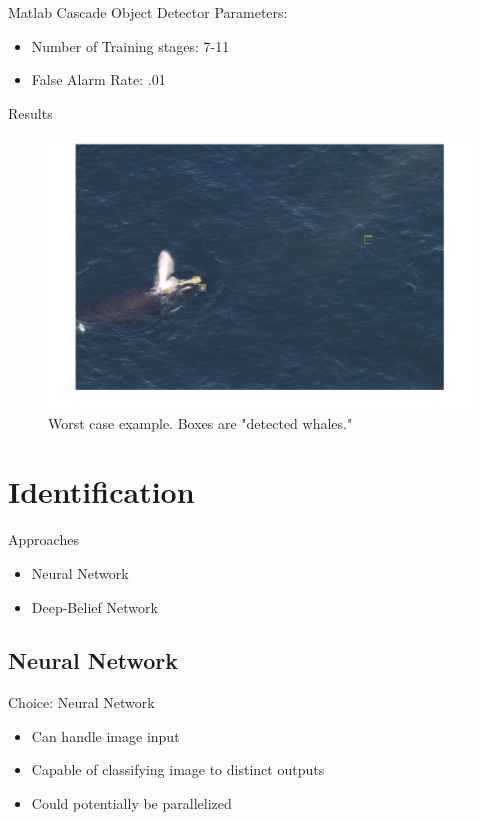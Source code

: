 \documentclass{beamer}
\begin{document}
\begin{frame}{Matlab Cascade Object Detector}
Parameters:
\begin{itemize}
\item Number of Training stages: 7-11
\item False Alarm Rate: .01
\end{itemize}
\end{frame}

\begin{frame}{Results}
\begin{figure}
\includegraphics[scale=.23]{recog.png}
\caption{Worst case example. Boxes are "detected whales."}
\end{figure}
\end{frame}

\section{Identification}
\begin{frame}{Approaches}
\begin{itemize}
\item Neural Network
\item Deep-Belief Network
\end{itemize}
\end{frame}

\subsection{Neural Network}
\begin{frame}{Choice: Neural Network}
\begin{itemize}
\item Can handle image input
\item Capable of classifying image to distinct outputs
\item Could potentially be parallelized
\end{itemize}
\end{frame}
\end{document}

